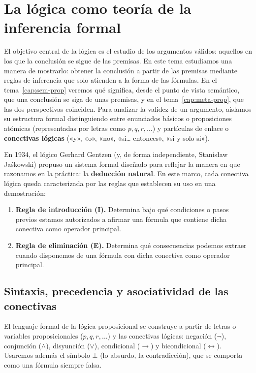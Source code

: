 \section{La lógica como teoría de la inferencia formal}

El objetivo central de la lógica es el estudio de los argumentos válidos: aquellos en los que la conclusión se sigue de las premisas. En este tema estudiamos una manera de mostrarlo: obtener la conclusión a partir de las premisas mediante reglas de inferencia que solo atienden a la forma de las fórmulas. En el tema~\ref{cap:sem-prop} veremos qué significa, desde el punto de vista semántico, que una conclusión se siga de unas premisas, y en el tema~\ref{cap:meta-prop}, que las dos perspectivas coinciden. Para analizar la validez de un argumento, aislamos su estructura formal distinguiendo entre enunciados básicos o proposiciones atómicas (representadas por letras como $p, q, r, \dots$) y partículas de enlace o \textbf{conectivas lógicas} («y», «o», «no», «si\ldots{} entonces», «si y solo si»).

En 1934, el lógico Gerhard Gentzen (y, de forma independiente,
Stanisław Jaśkowski) propuso un sistema formal diseñado
para reflejar la manera en que razonamos en la
práctica: la \textbf{deducción natural}. En este marco, cada conectiva
lógica queda caracterizada por las reglas que establecen su uso en una demostración:

\begin{enumerate}
    \item \textbf{Regla de introducción (I).} Determina bajo qué condiciones o pasos previos estamos autorizados a afirmar una fórmula que contiene dicha conectiva como operador principal.
    \item \textbf{Regla de eliminación (E).} Determina qué consecuencias podemos extraer cuando disponemos de una fórmula con dicha conectiva como operador principal.
\end{enumerate}

\subsection{Sintaxis, precedencia y asociatividad de las conectivas}\label{sec:precedencia}

El lenguaje formal de la lógica proposicional se construye a partir de letras o variables proposicionales ($p, q, r, \dots$) y las conectivas lógicas: negación ($\neg$), conjunción ($\land$), disyunción ($\lor$), condicional ($\to$) y bicondicional ($\leftrightarrow$). Usaremos además el símbolo $\bot$ (lo absurdo, la contradicción), que se comporta como una fórmula siempre falsa.


